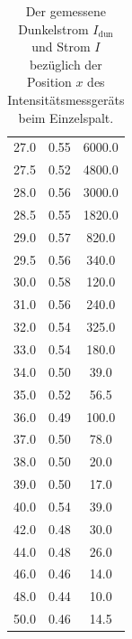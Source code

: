 \begin{table}
\begin{tabular}[t]{|ccc}
    27.0 & 0.55 & 6000.0    \\
    27.5 & 0.52 & 4800.0    \\
    28.0 & 0.56 & 3000.0    \\
    28.5 & 0.55 & 1820.0    \\
    29.0 & 0.57 & 820.0     \\
    29.5 & 0.56 & 340.0     \\
    30.0 & 0.58 & 120.0     \\
    31.0 & 0.56 & 240.0     \\
    32.0 & 0.54 & 325.0     \\
    33.0 & 0.54 & 180.0     \\
    34.0 & 0.50 & 39.0      \\
    35.0 & 0.52 & 56.5      \\
    36.0 & 0.49 & 100.0     \\
    37.0 & 0.50 & 78.0      \\
    38.0 & 0.50 & 20.0      \\
    39.0 & 0.50 & 17.0      \\
    40.0 & 0.54 & 39.0      \\
    42.0 & 0.48 & 30.0      \\
    44.0 & 0.48 & 26.0      \\
    46.0 & 0.46 & 14.0      \\
    48.0 & 0.44 & 10.0      \\
    50.0 & 0.46 & 14.5      \\
    \bottomrule
    \end{tabular}
    \caption{Der gemessene Dunkelstrom $I_\text{dun}$ und Strom $I$ bezüglich der Position $x$ des Intensitätsmessgeräts beim Einzelspalt.}
    \label{tab:einzel}
\end{table}
\FloatBarrier
